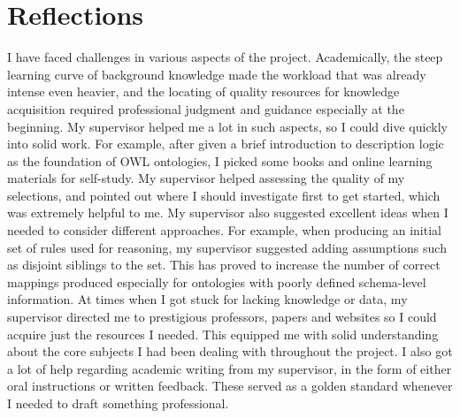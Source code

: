 \section{Reflections}
I have faced challenges in various aspects of the project. Academically, the steep learning curve of background knowledge made the workload that was already intense even heavier, and the locating of quality resources for knowledge acquisition required professional judgment and guidance especially at the beginning. My supervisor helped me a lot in such aspects, so I could dive quickly into solid work. For example, after given a brief introduction to description logic as the foundation of OWL ontologies, I picked some books and online learning materials for self-study. My supervisor helped assessing the quality of my selections, and pointed out where I should investigate first to get started, which was extremely helpful to me. My supervisor also suggested excellent ideas when I needed to consider different approaches. For example, when producing an initial set of rules used for reasoning, my supervisor suggested adding assumptions such as disjoint siblings to the set. This has proved to increase the number of correct mappings produced especially for ontologies with poorly defined schema-level information. At times when I got stuck for lacking knowledge or data, my supervisor directed me to prestigious professors, papers and websites so I could acquire just the resources I needed. This equipped me with solid understanding about the core subjects I had been dealing with throughout the project. I also got a lot of help regarding academic writing from my supervisor, in the form of either oral instructions or written feedback. These served as a golden standard whenever I needed to draft something professional.
\\\\
